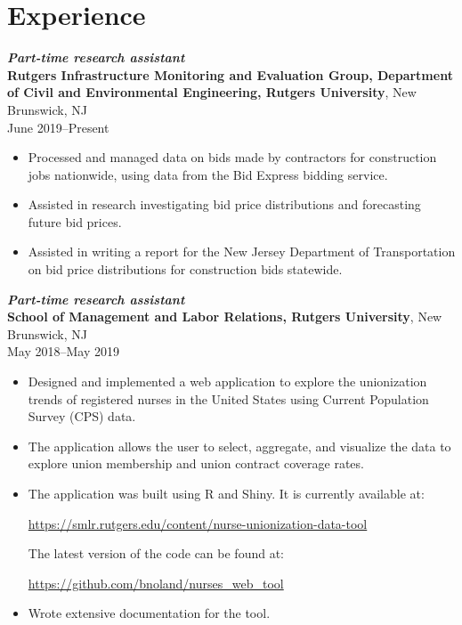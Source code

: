 \documentclass[letterpaper,12pt]{article}
\begin{document}
\section*{Experience}

\textit{\textbf{Part-time research assistant}} \\
\textbf{Rutgers Infrastructure Monitoring and Evaluation Group,
  Department of Civil and Environmental Engineering, Rutgers
  University},
New Brunswick, NJ \\
June 2019--Present
\begin{itemize}
\item Processed and managed data on bids made by contractors for
  construction jobs nationwide, using data from the Bid Express
  bidding service.
\item Assisted in research investigating bid price distributions and
  forecasting future bid prices.
\item Assisted in writing a report for the New Jersey Department of
  Transportation on bid price distributions for construction bids
  statewide.
\end{itemize}

\textit{\textbf{Part-time research assistant}} \\
\textbf{School of Management and Labor Relations, Rutgers University},
New Brunswick, NJ \\
May 2018--May 2019
\begin{itemize}
\item Designed and implemented a web application to explore the
  unionization trends of registered nurses in the United States using
  Current Population Survey (CPS) data.
\item The application allows the user to select, aggregate, and
  visualize the data to explore union membership and union contract
  coverage rates.
\item The application was built using R and Shiny. It is currently
  available at:
  \begin{center}
    \url{https://smlr.rutgers.edu/content/nurse-unionization-data-tool}
  \end{center}
  The latest version of the code can be found at:
  \begin{center}
    \url{https://github.com/bnoland/nurses_web_tool}
  \end{center}
\item Wrote extensive documentation for the tool.
\end{itemize}
\end{document}
